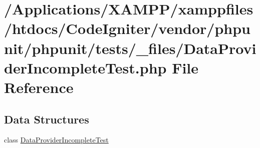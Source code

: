 \hypertarget{_data_provider_incomplete_test_8php}{}\section{/\+Applications/\+X\+A\+M\+P\+P/xamppfiles/htdocs/\+Code\+Igniter/vendor/phpunit/phpunit/tests/\+\_\+files/\+Data\+Provider\+Incomplete\+Test.php File Reference}
\label{_data_provider_incomplete_test_8php}
\subsection*{Data Structures}
\begin{DoxyCompactItemize}
\item 
class \mbox{\hyperlink{class_data_provider_incomplete_test}{Data\+Provider\+Incomplete\+Test}}
\end{DoxyCompactItemize}
